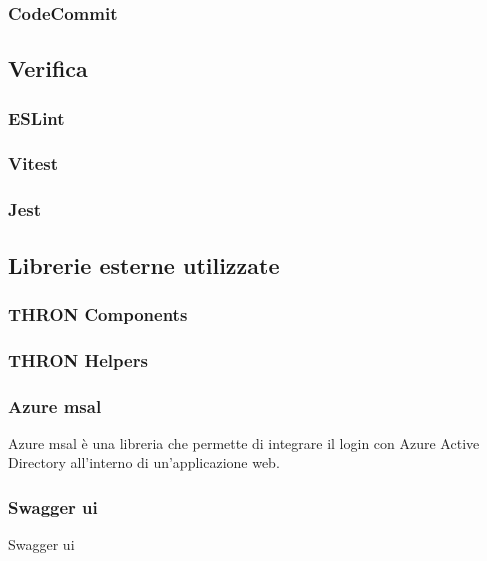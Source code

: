 \subsubsection{CodeCommit}\label{subsubsec:CodeCommit}

\subsection{Verifica}\label{subsec:verifica}
\subsubsection{ESLint}\label{subsubsec:eslint}
\subsubsection{Vitest}\label{subsubsec:vitest}
\subsubsection{Jest}\label{subsubsec:jest}

\subsection{Librerie esterne utilizzate}\label{subsec:librerie-esterne}
\subsubsection{THRON Components}\label{subsubsec:thron-components}
\subsubsection{THRON Helpers}\label{subsubsec:thron-helpers}
\subsubsection{Azure msal}\label{subsubsec:azure-msal}
Azure msal è una libreria che permette di integrare il login con Azure Active Directory all'interno di un'applicazione web.
\subsubsection{Swagger ui}\label{subsubsec:swagger-ui}
Swagger ui 


